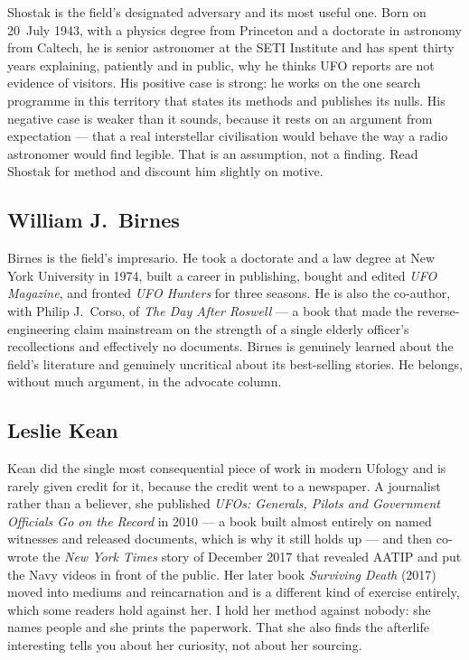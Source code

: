 Shostak is the field's designated adversary and its most useful one. Born on
20~July 1943, with a physics degree from Princeton and a doctorate in astronomy from
Caltech, he is senior astronomer at the SETI Institute and has spent thirty years
explaining, patiently and in public, why he thinks UFO reports are not evidence of visitors.
His positive case is strong: he works on the one search programme in this territory that
states its methods and publishes its nulls. His negative case is weaker than it sounds,
because it rests on an argument from expectation --- that a real interstellar civilisation
would behave the way a radio astronomer would find legible. That is an assumption, not a
finding. Read Shostak for method and discount him slightly on motive.

\subsection{William J.~Birnes}

Birnes is the field's impresario. He took a doctorate and a law degree
at New York University in 1974, built a career in publishing, bought and edited
\emph{UFO Magazine}, and fronted \emph{UFO Hunters} for three seasons. He is also the
co-author, with Philip J.~Corso, of \emph{The Day After Roswell} --- a book that made the
reverse-engineering claim mainstream on the strength of a single elderly officer's
recollections and effectively no documents. Birnes is genuinely learned about the field's
literature and genuinely uncritical about its best-selling stories. He belongs, without
much argument, in the advocate column.

\subsection{Leslie Kean}

Kean did the single most consequential piece of work in modern Ufology and
is rarely given credit for it, because the credit went to a newspaper. A journalist rather
than a believer, she published \emph{UFOs: Generals, Pilots and Government Officials Go on
the Record} in 2010 --- a book built almost entirely on named witnesses and released
documents, which is why it still holds up --- and then co-wrote the \emph{New York Times}
story of December 2017 that revealed AATIP and put the Navy videos in front of the public.
Her later book \emph{Surviving Death} (2017) moved into mediums and reincarnation and is a
different kind of exercise entirely, which some readers hold against her. I hold her
method against nobody: she names people and she prints the paperwork. That she also finds
the afterlife interesting tells you about her curiosity, not about her sourcing.

